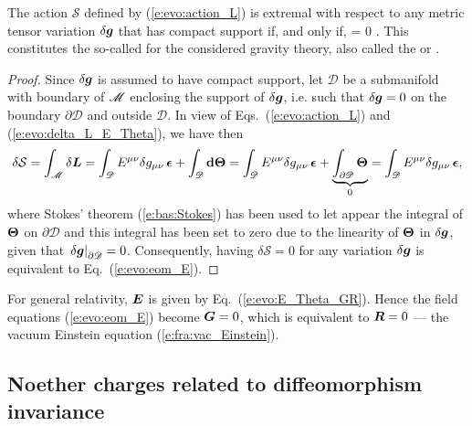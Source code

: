 \begin{prop}
The action $\mathcal{S}$ defined by (\ref{e:evo:action_L}) is extremal with respect to any
metric tensor variation $\delta\bm{g}$ that has compact support if, and only if,
\be \label{e:evo:eom_E}
     = 0 .
\ee
This constitutes the so-called  for the considered gravity theory, also called the  or
.
\end{prop}
\begin{proof}
Since $\delta\bm{g}$ is assumed to have compact support, let $\mathscr{D}$ be
a submanifold with boundary of $\mathscr{M}$ enclosing the support of $\delta\bm{g}$, i.e. such that
$\delta\bm{g} = 0$ on the boundary $\partial\mathscr{D}$ and outside $\mathscr{D}$.
In view of Eqs.~(\ref{e:evo:action_L}) and (\ref{e:evo:delta_L_E_Theta}), we have then
\[
    \delta \mathcal{S} = \int_{\mathscr{M}} \delta\bm{L} = \int_{\mathscr{D}} E^{\mu\nu} \delta g_{\mu\nu} \, \bm{\epsilon}
        + \int_{\mathscr{D}} \mathbf{d} \bm{\Theta}
     = \int_{\mathscr{D}} E^{\mu\nu} \delta g_{\mu\nu} \, \bm{\epsilon}
        + \underbrace{\int_{\partial\mathscr{D}} \bm{\Theta}}_{0}
     =  \int_{\mathscr{D}} E^{\mu\nu} \delta g_{\mu\nu} \, \bm{\epsilon} ,
\]
where Stokes' theorem (\ref{e:bas:Stokes}) has been used to let appear the integral
of $\bm{\Theta}$ on $\partial\mathscr{D}$ and this integral has been set to zero due
to the linearity of $\bm{\Theta}$ in $\delta\bm{g}$, given that $\left. \delta\bm{g} \right |_{\partial\mathscr{D}} = 0$.
Consequently, having $\delta \mathcal{S} = 0$ for any variation $\delta\bm{g}$ is equivalent to
Eq.~(\ref{e:evo:eom_E}).
\end{proof}

\begin{example} \label{x:evo:field_equations_GR}
For general relativity, $\bm{E}$ is given by Eq.~(\ref{e:evo:E_Theta_GR}).
Hence the field equations (\ref{e:evo:eom_E}) become $\bm{G} = 0$, which
is equivalent to $\bm{R}=0$ --- the
vacuum Einstein equation
(\ref{e:fra:vac_Einstein}).
\end{example}

\subsection{Noether charges related to diffeomorphism invariance}

